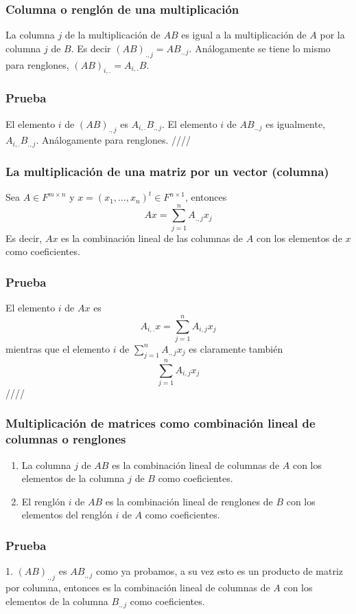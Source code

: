 \documentclass{article}
\begin{document}
\subsubsection{Columna o renglón de una multiplicación}
La columna $j$ de la multiplicación de $AB$ es igual a la
multiplicación de $A$ por la columna $j$ de $B$. Es decir
$(AB)_{.,j} = A B_{.,j}$. Análogamente se tiene lo mismo para renglones,
$(AB)_{i,.} = A_{i,.} B$.

\subsubsection*{Prueba}
El elemento $i$ de $(AB)_{.,j}$ es $A_{i,.} B_{.,j}$.
El elemento $i$ de $AB_{.,j}$ es igualmente, $A_{i,.}B_{.,j}$.
Análogamente para renglones. \hfill ////

\subsubsection{La multiplicación de una matriz por un vector (columna)}
Sea $A\in F^{m\times n}$ y $x=(x_1,\ldots,x_n)^t\in F^{n\times 1}$,
entonces
$$Ax=\sum^n_{j=1}A_{.,j} x_j$$
Es decir, $Ax$ es la combinación lineal de las columnas de $A$
con los elementos de $x$ como coeficientes.
\subsubsection*{Prueba}
El elemento $i$ de $Ax$ es
$$A_{i,.}x=\sum^n_{j=1}A_{i,j}x_j$$
mientras que el elemento $i$ de $\sum^n_{j=1}A_{.,j} x_j$
es claramente también
$$\sum^n_{j=1}A_{i,j} x_j$$
\hfill ////

\subsubsection{Multiplicación de matrices como combinación lineal
de columnas o renglones}
\begin{enumerate}
    \item La columna $j$ de $AB$ es la combinación lineal de columnas
    de $A$ con los elementos de la columna $j$ de $B$ como coeficientes.
    \item El renglón $i$ de $AB$ es la combinación lineal de renglones
    de $B$ con los elementos del renglón $i$ de $A$ como coeficientes.
\end{enumerate}
\subsubsection*{Prueba}
1. $(AB)_{.,j}$ es $AB_{.,j}$ como ya probamos, a su vez esto
es un producto de matriz por columna, entonces es la combinación lineal
de columnas de $A$ con los elementos de la columna $B_{.,j}$ como
coeficientes.
\end{document}
